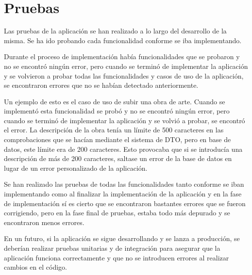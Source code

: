 \chapter{Pruebas}

{ \setlength{\parskip}{6mm} %
Las pruebas de la aplicación se han realizado a lo largo del desarrollo de la misma. Se ha
ido probando cada funcionalidad conforme se iba implementando.

Durante el proceso de implementación había funcionalidades que se probaron y no se
encontró ningún error, pero cuando se terminó de implementar la aplicación y se volvieron
a probar todas las funcionalidades y casos de uso de la aplicación, se encontraron errores
que no se habían detectado anteriormente.

Un ejemplo de esto es el caso de uso de subir una obra de arte. Cuando se implementó
esta funcionalidad se probó y no se encontró ningún error, pero cuando se terminó de
implementar la aplicación y se volvió a probar, se encontró el error. La descripción
de la obra tenía un límite de 500 caracteres en las comprobaciones que se hacían mediante
el sistema de DTO, pero en base de datos, este límite era de 200 caracteres. Esto provocaba
que si se introducía una descripción de más de 200 caracteres, saltase un error de la base de
datos en lugar de un error personalizado de la aplicación.

Se han realizado las pruebas de todas las funcionalidades tanto conforme se iban
implementando como al finalizar la implementación de la aplicación y en la fase de
implementación sí es cierto que se encontraron bastantes errores que se fueron corrigiendo,
pero en la fase final de pruebas, estaba todo más depurado y se encontraron menos errores.

En un futuro, si la aplicación se sigue desarrollando y se lanza a producción, se deberían
realizar pruebas unitarias y de integración para asegurar que la aplicación funciona
correctamente y que no se introducen errores al realizar cambios en el código.
}